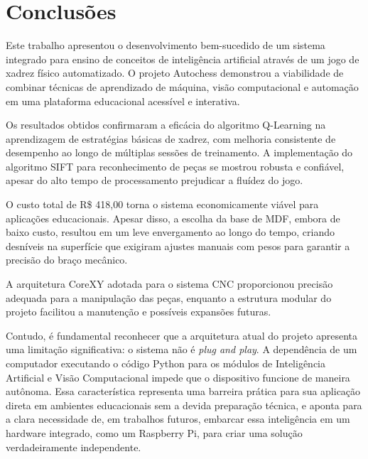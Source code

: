 \documentclass[a4paper]{ifacconf}
\begin{document}
\section{Conclusões}

\par\noindent Este trabalho apresentou o desenvolvimento bem-sucedido de um sistema integrado para ensino de conceitos de inteligência artificial através de um jogo de xadrez físico automatizado. O projeto Autochess demonstrou a viabilidade de combinar técnicas de aprendizado de máquina, visão computacional e automação em uma plataforma educacional acessível e interativa.

\par\noindent Os resultados obtidos confirmaram a eficácia do algoritmo Q-Learning na aprendizagem de estratégias básicas de xadrez, com melhoria consistente de desempenho ao longo de múltiplas sessões de treinamento. A implementação do algoritmo SIFT para reconhecimento de peças se mostrou robusta e confiável, apesar do alto tempo de processamento prejudicar a fluídez do jogo.

\par\noindent O custo total de R\$ 418,00 torna o sistema economicamente viável para aplicações educacionais. Apesar disso, a escolha da base de MDF, embora de baixo custo, resultou em um leve envergamento ao longo do tempo, criando desníveis na superfície que exigiram ajustes manuais com pesos para garantir a precisão do braço mecânico.

\par\noindent A arquitetura CoreXY adotada para o sistema CNC proporcionou precisão adequada para a manipulação das peças, enquanto a estrutura modular do projeto facilitou a manutenção e possíveis expansões futuras.

\par\noindent Contudo, é fundamental reconhecer que a arquitetura atual do projeto apresenta uma limitação significativa: o sistema não é \textit{plug and play}. A dependência de um computador executando o código Python para os módulos de Inteligência Artificial e Visão Computacional impede que o dispositivo funcione de maneira autônoma. Essa característica representa uma barreira prática para sua aplicação direta em ambientes educacionais sem a devida preparação técnica, e aponta para a clara necessidade de, em trabalhos futuros, embarcar essa inteligência em um hardware integrado, como um Raspberry Pi, para criar uma solução verdadeiramente independente.
\end{document}

